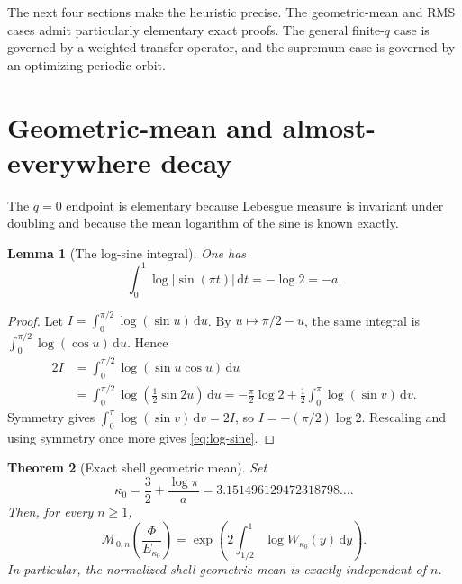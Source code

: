 \documentclass[11pt,oneside]{article}
\numberwithin{equation}{section}
\newtheorem{theorem}{Theorem}[section]
\newtheorem{lemma}[theorem]{Lemma}
\theoremstyle{definition}
\theoremstyle{remark}
\newcommand{\dd}{\,\mathrm d}
\newcommand{\abs}[1]{\left|#1\right|}
\newcommand{\PhiUp}{\Phi}
\begin{document}
\begin{center}
\end{center}

The next four sections make the heuristic precise.  The geometric-mean and RMS cases admit
particularly elementary exact proofs.  The general finite-\(q\) case is governed by a
weighted transfer operator, and the supremum case is governed by an optimizing periodic
orbit.

\section{Geometric-mean and almost-everywhere decay}
\label{sec:typical}

The \(q=0\) endpoint is elementary because Lebesgue measure is invariant under doubling and
because the mean logarithm of the sine is known exactly.

\begin{lemma}[The log-sine integral]
\label{lem:log-sine}
One has
\begin{equation}
 \int_0^1\log\abs{\sin(\pi t)}\dd t=-\log2=-a.
 \label{eq:log-sine}
\end{equation}
\end{lemma}

\begin{proof}
Let \(I=\int_0^{\pi/2}\log(\sin u)\dd u\).  By \(u\mapsto\pi/2-u\), the same integral
is \(\int_0^{\pi/2}\log(\cos u)\dd u\).  Hence
\begin{align*}
 2I
 &=\int_0^{\pi/2}\log(\sin u\cos u)\dd u\\
 &=\int_0^{\pi/2}\log\!\left(\frac12\sin2u\right)\dd u
 =-\frac{\pi}{2}\log2+\frac12\int_0^\pi\log(\sin v)\dd v.
\end{align*}
Symmetry gives \(\int_0^\pi\log(\sin v)\dd v=2I\), so
\(I=-(\pi/2)\log2\).  Rescaling and using symmetry once more gives
\eqref{eq:log-sine}.
\end{proof}

\begin{theorem}[Exact shell geometric mean]
\label{thm:geometric-mean}
Set
\begin{equation}
 \boxed{\kappa_0=\frac32+\frac{\log\pi}{a}}
 =3.151496129472318798\ldots .
 \label{eq:kappa0}
\end{equation}
Then, for every \(n\ge1\),
\begin{equation}
 \mathcal M_{0,n}\!\left(\frac{\PhiUp}{E_{\kappa_0}}\right)
 =\exp\!\left(2\int_{1/2}^{1}\log W_{\kappa_0}(y)\dd y\right).
 \label{eq:exact-geometric-mean}
\end{equation}
In particular, the normalized shell geometric mean is exactly independent of \(n\).
\end{theorem}
\end{document}
